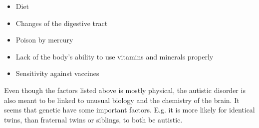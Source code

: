 \begin{itemize}
  
  \item{Diet}
  \item{Changes of the digestive tract}
  \item{Poison by mercury}
  \item{Lack of the body's ability to use vitamins and minerals properly}
  \item{Sensitivity against vaccines}
  
\end{itemize}

Even though the factors listed above is mostly physical, the autistic disorder is also meant to be linked to unusual biology and the chemistry of the brain.
It seems that genetic have some important factors. E.g. it is more likely for identical twins, than fraternal twins or siblings, to both be autistic.
